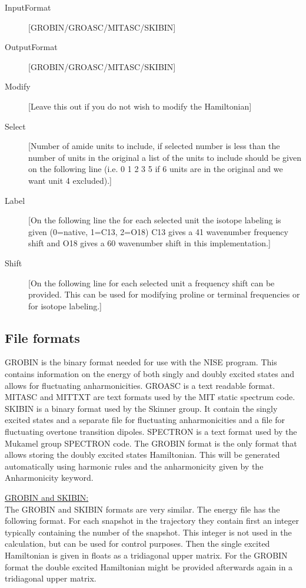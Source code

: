 \begin{description}
\item[InputFormat] [GROBIN/GROASC/MITASC/SKIBIN]
\item[OutputFormat] [GROBIN/GROASC/MITASC/SKIBIN]
\item[Modify][Leave this out if you do not wish to modify the Hamiltonian]
\item[Select] [Number of amide units to include, if selected number is less than the number of units in the original a list of the units to include should be given on the following line (i.e. 0 1 2 3 5 if 6 units are in the original and we want unit 4 excluded).]
\item[Label] [On the following line the for each selected unit the isotope labeling is given (0=native, 1=C13, 2=O18) C13 gives a 41 wavenumber frequency shift and O18 gives a 60 wavenumber shift in this implementation.]
\item[Shift] [On the following line for each selected unit a frequency shift can be provided. This can be used for modifying proline or terminal frequencies or for isotope labeling.]   
\end{description}

\subsection{File formats}
GROBIN is the binary format needed for use with the NISE program. This contains information on the energy of both singly and doubly excited states and allows for fluctuating anharmonicities.
GROASC is a text readable format.
MITASC and MITTXT are text formats used by the MIT static spectrum code.
SKIBIN is a binary format used by the Skinner group. It contain the singly excited states and a
separate file for fluctuating anharmonicities and a file for fluctuating overtone transition dipoles.
SPECTRON is a text format used by the Mukamel group SPECTRON code.
The GROBIN format is the only format that allows storing the doubly excited states Hamiltonian. This will be generated automatically using harmonic rules and the anharmonicity given by the Anharmonicity keyword.

\noindent
\underline{GROBIN and SKIBIN:}\\
The GROBIN and SKIBIN formats are very similar.
The energy file has the following format.
For each snapshot in the trajectory they contain first an integer typically containing the number of the snapshot. This integer is not used in the calculation, but can be used for control purposes.
Then the single excited Hamiltonian is given in floats as a tridiagonal upper matrix. For the GROBIN
format the double excited Hamiltonian might be provided afterwards again in a tridiagonal upper matrix.

